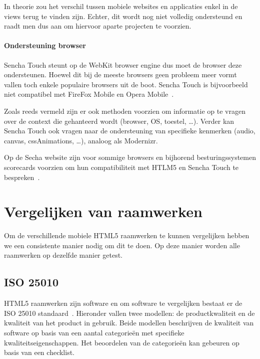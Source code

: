In theorie zou het verschil tussen mobiele websites en applicaties enkel in de views terug te vinden zijn.  Echter,  dit wordt nog niet volledig ondersteund en raadt men dus aan om hiervoor aparte projecten te voorzien.

\paragraph{Ondersteuning browser}
Sencha Touch steunt op de WebKit browser engine dus moet de browser deze ondersteunen.  Hoewel dit bij de meeste browsers geen probleem meer vormt vallen toch enkele populaire browsers uit de boot.  Sencha Touch is bijvoorbeeld niet compatibel met FireFox Mobile en Opera Mobile~\cite{JohnEClark2012}.

Zoals reeds vermeld zijn er ook methoden voorzien om informatie op te vragen over de context die gehanteerd wordt (browser, OS, toestel, …).  Verder kan Sencha Touch ook vragen naar de ondersteuning van specifieke kenmerken (audio,  canvas,  cssAnimations, …),  analoog als Modernizr.  

Op de Secha website zijn voor sommige browsers en bijhorend besturingssystemen scorecards voorzien om hun compatibiliteit met HTLM5 en Sencha Touch te bespreken~\cite{Inc.}.


\section{Vergelijken van raamwerken}
\label{sec:vergelijken-raamwerken}
Om de verschillende mobiele HTML5 raamwerken te kunnen vergelijken hebben we een consistente manier nodig om dit te doen.  Op deze manier worden alle raamwerken op dezelfde manier getest.

\subsection{ISO 25010}
HTML5 raamwerken zijn software en om software te vergelijken bestaat er de ISO 25010 standaard~\cite{Standard2010}.  Hieronder vallen twee modellen:  de productkwaliteit en de kwaliteit van het product in gebruik.  Beide modellen beschrijven de kwaliteit van software op basis van een aantal categorieën met specifieke kwaliteitseigenschappen. Het beoordelen van de categorieën kan gebeuren op basis van een checklist. 

